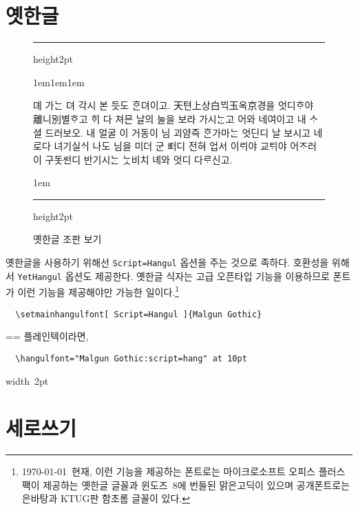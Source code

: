 \documentclass[a4paper]{article}
\def\grayhrule{{\color{white!80!black}\hrule height2pt}}
\def\grayvrule{{\color{white!80!black}\vrule width 2pt}}
\newenvironment{plaintex}
  {\setbox0=\vbox\bgroup\hsize=\dimexpr\textwidth-12pt\relax\medbreak\small}
  {\medbreak\egroup \par\medskip
    \ifdim\ht0<\dimexpr\pagegoal-\pagetotal\relax
      \hbox{\grayvrule\kern10pt\box0}%
    \else
      \setbox2=\vsplit0 to\dimexpr\pagegoal-\pagetotal\relax
      \lineskip=0pt
      \ifvoid2 \else\hbox{\grayvrule\kern10pt\box2}\fi
      \ifvoid0 \else\hbox{\grayvrule\kern10pt\box0}\fi
    \fi \par\medskip }
\newenvironment{example}
  {\hbox\bgroup\grayvrule
    \vbox\bgroup\hsize\dimexpr\textwidth-4pt\relax
    \grayhrule\kern1em\leftskip1em\rightskip1em
  }{\par\kern1em\grayhrule\egroup\grayvrule\egroup}
\begin{document}
\section{옛한글}

\begin{figure}
  \begin{example}
    \hanjabyhangulfont%
    \obeylines\centering
뎨 가ᄂᆞᆫ 뎌 각시 본 듯도 ᄒᆞᆫ뎌이고.
天텬上상白ᄇᆡᆨ玉옥京경을 엇디ᄒᆞ야 離니別별ᄒᆞ고
ᄒᆡ 다 져믄 날의 눌을 보라 가시ᄂᆞᆫ고
\medbreak
어와 네여이고 내 ᄉᆞ셜 드러보오.
내 얼굴 이 거동이 님 괴얌즉 ᄒᆞᆫ가마ᄂᆞᆫ
엇딘디 날 보시고 네로다 녀기실ᄉᆡ
나도 님을 미더 군 ᄠᅥ디 전혀 업서
이ᄅᆡ야 교ᄐᆡ야 어ᄌᆞ러이 구돗ᄯᅥᆫ디
반기시ᄂᆞᆫ ᄂᆞᆺ비치 녜와 엇디 다ᄅᆞ신고.
  \end{example}
  \caption{옛한글 조판 보기}\label{fig:yethangul}
\end{figure}

옛한글을 사용하기 위해선 \verb|Script=Hangul| 옵션을 주는 것으로 족하다.
호환성을 위해서 \verb|YetHangul| 옵션도 제공한다.
옛한글 식자는 고급 오픈타입 기능을 이용하므로
폰트가 이런 기능을 제공해야만 가능한 일이다.\footnote{%
\today\ 현재, 이런 기능을 제공하는 폰트로는 마이크로소프트 오피스 플러스팩이
제공하는 옛한글 글꼴과 윈도즈~8에 번들된 맑은고딕이 있으며
공개폰트로는 은바탕과 KTUG판 함초롬 글꼴이 있다.}
\begin{verbatim}
  \setmainhangulfont[ Script=Hangul ]{Malgun Gothic}
\end{verbatim}
\begin{plaintex}
플레인텍이라면,
\begin{verbatim}
  \hangulfont="Malgun Gothic:script=hang" at 10pt
\end{verbatim}
\end{plaintex}

\section{세로쓰기}
\end{document}
